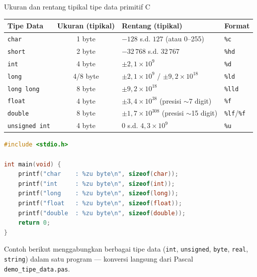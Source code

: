 \documentclass[../main.tex]{subfiles}
\begin{document}
\begin{modultable}[]{Ukuran dan rentang tipikal tipe data primitif C}
\begin{tabular}{|l|c|l|l|}
\hline
\textbf{Tipe Data} & \textbf{Ukuran (tipikal)} & \textbf{Rentang (tipikal)} & \textbf{Format} \\
\hline
\texttt{char} & 1 byte & $-128$ s.d. $127$ (atau 0--255) & \texttt{\%c} \\
\hline
\texttt{short} & 2 byte & $-32\,768$ s.d. $32\,767$ & \texttt{\%hd} \\
\hline
\texttt{int} & 4 byte & $\pm 2{,}1 \times 10^{9}$ & \texttt{\%d} \\
\hline
\texttt{long} & 4/8 byte & $\pm 2{,}1 \times 10^{9}$ / $\pm 9{,}2 \times 10^{18}$ & \texttt{\%ld} \\
\hline
\texttt{long long} & 8 byte & $\pm 9{,}2 \times 10^{18}$ & \texttt{\%lld} \\
\hline
\texttt{float} & 4 byte & $\pm 3{,}4 \times 10^{38}$ (presisi $\sim$7 digit) & \texttt{\%f} \\
\hline
\texttt{double} & 8 byte & $\pm 1{,}7 \times 10^{308}$ (presisi $\sim$15 digit) & \texttt{\%lf}/\texttt{\%f} \\
\hline
\texttt{unsigned int} & 4 byte & $0$ s.d. $4{,}3 \times 10^{9}$ & \texttt{\%u} \\
\hline
\end{tabular}
\end{modultable}

\begin{lstlisting}[language=C,caption=Menampilkan ukuran tipe data dengan \texttt{sizeof}]
#include <stdio.h>

int main(void) {
    printf("char    : %zu byte\n", sizeof(char));
    printf("int     : %zu byte\n", sizeof(int));
    printf("long    : %zu byte\n", sizeof(long));
    printf("float   : %zu byte\n", sizeof(float));
    printf("double  : %zu byte\n", sizeof(double));
    return 0;
}
\end{lstlisting}

\begin{catatan}
Contoh berikut menggabungkan berbagai tipe data (\texttt{int}, \texttt{unsigned}, \texttt{byte}, \texttt{real}, \texttt{string}) dalam satu program --- konversi langsung dari Pascal \texttt{demo\_tipe\_data.pas}.
\end{catatan}


\end{document}
